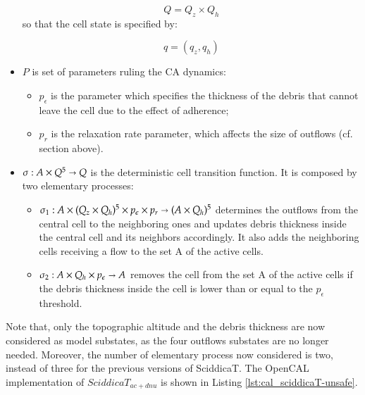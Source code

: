 \begin{itemize}
$$Q = Q_z \times Q_h$$
so that the cell state is specified by:

$$ q = (q_z, q_h)$$

\item   $P$ is set of parameters ruling the CA dynamics:

\begin{itemize}
    \item   $p_\epsilon$ is the parameter which specifies the thickness of the debris that cannot leave the cell due to the effect of adherence;
    \item   $p_r$ is the relaxation rate parameter, which affects the size of outflows (cf. section above).
\end{itemize}

\item $\sigma : A \times Q^5 \shortrightarrow Q$ is the deterministic cell
  transition function. It is composed by two elementary processes:
\begin{itemize}
\item $\sigma_1 : A \times (Q_z \times Q_h)^5 \times p_\epsilon \times
  p_r\shortrightarrow (A \times Q_h)^5$ determines the outflows from
  the central cell to the neighboring ones and updates debris
  thickness inside the central cell and its neighbors accordingly. It
  also adds the neighboring cells receiving a flow to the set A of the
  active cells.

\item $\sigma_2: A \times Q_h \times p_\epsilon \shortrightarrow A$ removes the
  cell from the set A of the active cells if the debris thickness
  inside the cell is lower than or equal to the $p_\epsilon$
  threshold.

\end{itemize}
\end{itemize}

Note that, only the topographic altitude and the debris thickness are
now considered as model substates, as the four outflows substates are
no longer needed. Moreover, the number of elementary process now
considered is two, instead of three for the previous versions of
SciddicaT. The OpenCAL implementation of $SciddicaT_{ac+dnu}$ is shown
in Listing \ref{lst:cal_sciddicaT-unsafe}.




